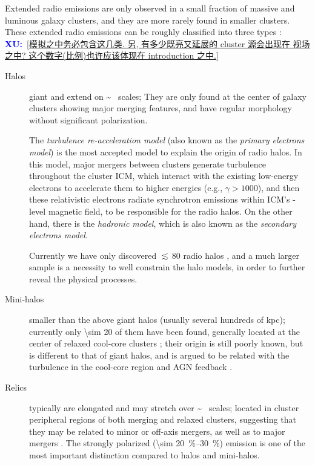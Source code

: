 \documentclass[modern]{aastex61}
\newcommand{\XU}[1]{\textcolor{blue}{\textbf{XU:}}~\uline{#1}}
\begin{document}
Extended radio emissions are only observed in a small fraction of massive
and luminous galaxy clusters, and they are more rarely found in smaller
clusters.
These extended radio emissions can be roughly classified into three types
\citep[see][for recent reviews]{feretti2012rev,brunetti2014rev}:
\XU{[模拟之中务必包含这几类. 另, 有多少既亮又延展的 cluster 源会出现在
  视场之中? 这个数字(比例)也许应该体现在 introduction 之中.]}
\begin{description}
  \item[Halos]
    giant and extend on \si{\sim \Mpc} scales;
    They are only found at the center of galaxy clusters showing major
    merging features, and have regular morphology without significant
    polarization.

    The \emph{turbulence re-acceleration model} (also known as the
    \emph{primary electrons model}) is the most accepted model to explain
    the origin of radio halos.
    In this model, major mergers between clusters generate turbulence
    throughout the cluster ICM, which interact with the existing low-energy
    electrons to accelerate them to higher energies (e.g., $\gamma > 1000$),
    and then these relativistic electrons radiate synchrotron emissions
    within ICM's \si{\uG}-level magnetic field, to be responsible for the
    radio halos.
    On the other hand, there is the \emph{hadronic model}, which is also
    known as the \emph{secondary electrons model}.

    Currently we have only discovered $\lesssim\,$80 radio halos
    \citep{kale2016rev,duchesne2017}, and a much larger sample is a
    necessity to well constrain the halo models, in order to further reveal
    the physical processes.

  \item[Mini-halos]
    smaller than the above giant halos (usually several hundreds of kpc);
    currently only \num{\sim 20} of them have been found, generally located
    at the center of relaxed cool-core clusters \citep{bravi2016};
    their origin is still poorly known, but is different to that of giant
    halos, and is argued to be related with the turbulence in the cool-core
    region and AGN feedback \citep{gitti2015rev}.

  \item[Relics]
    typically are elongated and may stretch over \si{\sim \Mpc} scales;
    located in cluster peripheral regions of both merging and relaxed
    clusters, suggesting that they may be related to minor or off-axis
    mergers, as well as to major mergers \citep{feretti2012rev}.
    The strongly polarized (\SIrange{\sim 20}{30}{\percent}) emission is
    one of the most important distinction compared to halos and mini-halos.


\end{description}
\end{document}
